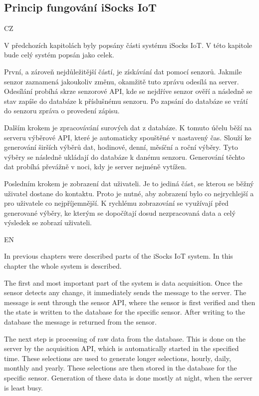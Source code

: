 \documentclass[12pt, a4paper]{article}
\begin{document}
\subsection*{Princip fungování iSocks IoT}

CZ

V předchozích kapitolách byly popsány části systému iSocks IoT.
V této kapitole bude celý systém popsán jako celek.

První, a zároveň nejdůležitější částí, je získávání dat pomocí senzorů.
Jakmile senzor zaznamená jakoukoliv změnu, okamžitě tuto zprávu odesílá na server.
Odesílání probíhá skrze senzorové API, kde se nejdříve senzor ověří a následně se stav zapíše do databáze k příslušnému senzoru.
Po zapsání do databáze se vrátí do senzoru zpráva o provedení zápisu.

Dalším krokem je zpracovávání surových dat z databáze.
K tomuto účelu běží na serveru výběrové API, které je automaticky spouštěné v nastavený čas.
Slouží ke generování širších výběrů dat, hodinové, denní, měsíční a roční výběry.
Tyto výběry se následně ukládají do databáze k danému senzoru.
Generování těchto dat probíhá převážně v noci, kdy je server nejméně vytížen.

Posledním krokem je zobrazení dat uživateli.
Je to jediná část, se kterou se běžný uživatel dostane do kontaktu.
Proto je nutné, aby zobrazení bylo co nejrychlejší a pro uživatele co nejpříjemnější.
K rychlému zobrazování se využívají před generované výběry, ke kterým se dopočítají dosud nezpracovaná data a celý výsledek se zobrazí uživateli.

EN

In previous chapters were described parts of the iSocks IoT system.
In this chapter the whole system is described.

The first and most important part of the system is data acquisition.
Once the sensor detects any change, it immediately sends the message to the server.
The message is sent through the sensor API, where the sensor is first verified and then the state is written to the database for the specific sensor.
After writing to the database the message is returned from the sensor.

The next step is processing of raw data from the database.
This is done on the server by the acquisition API, which is automatically started in the specified time.
These selections are used to generate longer selections, hourly, daily, monthly and yearly.
These selections are then stored in the database for the specific sensor.
Generation of these data is done mostly at night, when the server is least busy.
\end{document}
